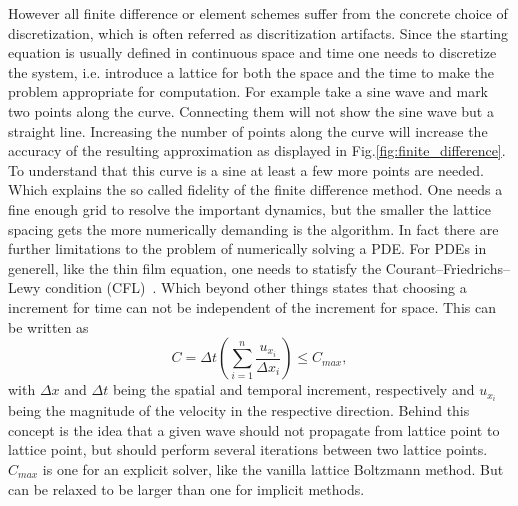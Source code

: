 However all finite difference or element schemes suffer from the concrete choice of discretization, which is often referred as discritization artifacts.
Since the starting equation is usually defined in continuous space and time one needs to discretize the system, i.e. introduce a lattice for both the space and the time to make the problem appropriate for computation. 
For example take a sine wave and mark two points along the curve.
Connecting them will not show the sine wave but a straight line.
Increasing the number of points along the curve will increase the accuracy of the resulting approximation as displayed in Fig.\ref{fig:finite_difference}.
To understand that this curve is a sine at least a few more points are needed.
Which explains the so called fidelity of the finite difference method.
One needs a fine enough grid to resolve the important dynamics, but the smaller the lattice spacing gets the more numerically demanding is the algorithm.
In fact there are further limitations to the problem of numerically solving a PDE.
For PDEs in generell, like the thin film equation, one needs to statisfy the Courant–Friedrichs–Lewy condition (CFL)~\cite{courant1928partiellen}.  
Which beyond other things states that choosing a increment for time can not be independent of the increment for space.
This can be written as
\begin{equation}\label{eq:CFL}
    C = \Delta t \left(\sum_{i=1}^n \frac{u_{x_i}}{\Delta x_i}\right) \leq C_{max},
\end{equation}
with $\Delta x$ and $\Delta t$ being the spatial and temporal increment, respectively and  $u_{x_i}$ being the magnitude of the velocity in the respective direction.
Behind this concept is the idea that a given wave should not propagate from lattice point to lattice point, but should perform several iterations between two lattice points.
$C_{max}$ is one for an explicit solver, like the vanilla lattice Boltzmann method.
But can be relaxed to be larger than one for implicit methods.

